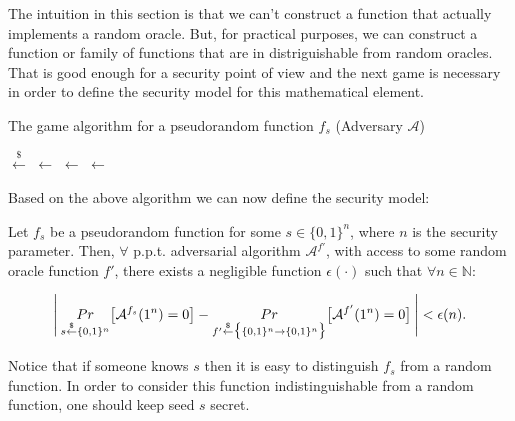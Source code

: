 The intuition in this section is that we can't construct a function that actually implements a random oracle. But, for practical purposes, we can construct a function or family of functions that are in distriguishable from random oracles. That is good enough for a security point of view and the next game is necessary in order to define the security model for this mathematical element.
\vspace{0.3cm}
\begin{algorithm}
  \caption{\label{alg:pseudorandom}The \textsf{game} algorithm
    for a pseudorandom function $f_{s}$ (Adversary $\mathcal{A}$)}
    \begin{algorithmic}[1]
            \State {} $\overset{\$}{\gets}$ 
                \State {} $\gets$ 
              \Else
                \State {} $\gets$ 
              \EndIf
              \State {} $\gets$ 
                \State {}
              \EndIf
            \State{}
        \EndFunction
    \end{algorithmic}
\end{algorithm}
\vspace{0.3cm}

\noindent Based on the above algorithm we can now define the security model:

\begin{definition}
  Let $f_{s}$ be a pseudorandom function for some $s \in \{0,1\}^{n}$, where $n$ is the security parameter. Then, $\forall$ p.p.t. adversarial algorithm $\mathcal{A}^{f'}$, with access to some random oracle function $f'$, there exists a negligible function $\epsilon(\cdot)$ such that $\forall n \in \mathbb{N}$:

  \begin{equation}{\label{eq:secmodel}}
    \Bigg{\lvert} \: \underset{s \overset{\$}{\gets} \{0,1\}^{n}}{Pr} \big{[} \mathcal{A}^{f_{s}}(1^{n}) = 0 \big{]} - \underset{f' \overset{\$}{\gets} \big{\{} \{0,1\}^{n}  \rightarrow \{0,1\}^{n} \big{\}}}{Pr} \big{[} \mathcal{A}^{f'}(1^{n}) = 0 \big{]} \: \Bigg{\rvert} < \epsilon(n).
  \end{equation}
\end{definition}

Notice that if someone knows $s$ then it is easy to distinguish $f_s$ from a random function. In order to consider this function indistinguishable from a random function, one should keep seed $s$ secret.
\clearpage
\pagebreak

